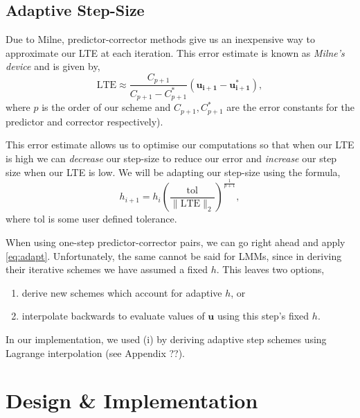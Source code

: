 \documentclass[12pt, twoside]{report}
\theoremstyle{plain}
\theoremstyle{definition}
\theoremstyle{definition}
\providecommand{\norm}[1]{\lVert#1\rVert}
\begin{document}
    \section{Adaptive Step-Size}
    \label{2_adaptive}
        Due to Milne, predictor-corrector methods give us an inexpensive way to
        approximate our LTE at each iteration. This error estimate is known as 
        \textit{Milne's device} and is given by,
        \begin{equation}
        \label{eq:2_milnes_device}
            \text{LTE} \approx \frac{C_{p+1}}{C_{p+1} - C_{p+1}^*} 
            (\mathbf{u_{i+1} - u_{i+1}^*}),
        \end{equation}
        where $p$ is the order of our scheme and $C_{p+1}, C_{p+1}^*$ are the 
        error constants for the predictor and corrector respectively). 

        This error estimate allows us to optimise our computations so that when
        our LTE is high we can \textit{decrease} our step-size to reduce our 
        error and \textit{increase} our step size when our LTE is low. We will 
        be adapting our step-size using the formula,
        \begin{equation}
        \label{eq:adapt}
            h_{i+1} = h_i \left(\frac{\text{tol}} 
            {\norm{\text{LTE}}_2}\right)^{\frac{1}{p+1}},
        \end{equation}
        where $\text{tol}$ is some user defined tolerance. 

        When using one-step predictor-corrector pairs, we can go right ahead 
        and apply \eqref{eq:adapt}. Unfortunately, the same cannot be said for 
        LMMs, since in deriving their iterative schemes we have assumed a fixed
        $h$. This leaves two options,
        \begin{enumerate}[label=(\roman*)]
            \item{derive new schemes which account for adaptive $h$, or}
            \item{interpolate backwards to evaluate values of $\mathbf{u}$
            using this step's fixed $h$.}
        \end{enumerate}
        In our implementation, we used (i) by deriving adaptive step schemes
        using Lagrange interpolation (see Appendix ??).


\chapter{Design \& Implementation}
\label{3_implementation}
\end{document}
